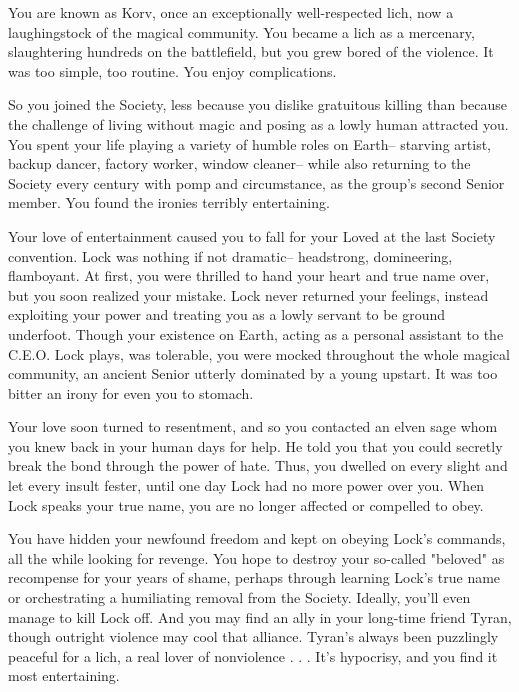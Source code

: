 \documentclass[char]{Sel}
\begin{document}
\name{\cKorv{}}
You are known as Korv, once an exceptionally well-respected lich, now a laughingstock of the magical community. You became a lich as a mercenary, slaughtering hundreds on the battlefield, but you grew bored of the violence. It was too simple, too routine. You enjoy complications.

So you joined the Society, less because you dislike gratuitous killing than because the challenge of living without magic and posing as a lowly human attracted you. You spent your life playing a variety of humble roles on Earth-- starving artist, backup dancer, factory worker, window cleaner-- while also returning to the Society every century with pomp and circumstance, as the group’s second Senior member. You found the ironies terribly entertaining.

Your love of entertainment caused you to fall for your Loved at the last Society convention. Lock was nothing if not dramatic-- headstrong, domineering, flamboyant. At first, you were thrilled to hand your heart and true name over, but you soon realized your mistake. Lock never returned your feelings, instead exploiting your power and treating you as a lowly servant to be ground underfoot. Though your existence on Earth, acting as a personal assistant to the C.E.O. Lock plays, was tolerable, you were mocked throughout the whole magical community, an ancient Senior utterly dominated by a young upstart. It was too bitter an irony for even you to stomach.

Your love soon turned to resentment, and so you contacted an elven sage whom you knew back in your human days for help. He told you that you could secretly break the bond through the power of hate. Thus, you dwelled on every slight and let every insult fester, until one day Lock had no more power over you. When Lock speaks your true name, you are no longer affected or compelled to obey.

You have hidden your newfound freedom and kept on obeying Lock’s commands, all the while looking for revenge. You hope to destroy your so-called "beloved" as recompense for your years of shame, perhaps through learning Lock’s true name or orchestrating a humiliating removal from the Society. Ideally, you’ll even manage to kill Lock off. And you may find an ally in your long-time friend Tyran, though outright violence may cool that alliance. Tyran’s always been puzzlingly peaceful for a lich, a real lover of nonviolence . . . It’s hypocrisy, and you find it most entertaining.
\end{document}
